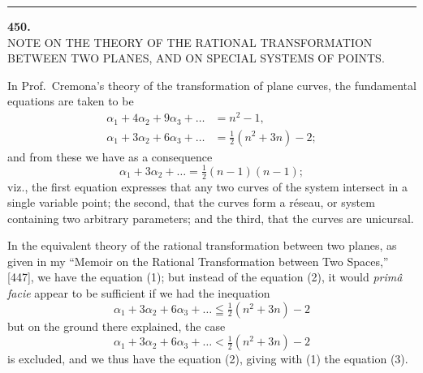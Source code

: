 \documentclass[11pt]{article}
\begin{document}
\bigskip
\hrule
\bigskip

\begin{center}
{\large\bfseries 450.}\\[6pt]
{\large NOTE ON THE THEORY OF THE RATIONAL TRANSFORMATION BETWEEN TWO PLANES, AND ON SPECIAL SYSTEMS OF POINTS.}
\end{center}

\medskip


\medskip

In Prof.\ Cremona's theory of the transformation of plane curves, the fundamental
equations are taken to be
\begin{align}
\alpha_1 + 4\alpha_2 + 9\alpha_3 + \ldots &= n^2 - 1 \tag{1},\\
\alpha_1 + 3\alpha_2 + 6\alpha_3 + \ldots &= \tfrac{1}{2}(n^2 + 3n) - 2 \tag{2};
\end{align}
and from these we have as a consequence
\begin{equation}
\alpha_1 + 3\alpha_2 + \ldots = \tfrac{1}{2}(n-1)(n-1) \tag{3};
\end{equation}
viz., the first equation expresses that any two curves of the system intersect in a
single variable point; the second, that the curves form a r\'eseau, or system containing
two arbitrary parameters; and the third, that the curves are unicursal.

In the equivalent theory of the rational transformation between two planes, as
given in my ``Memoir on the Rational Transformation between Two Spaces,'' [447], we
have the equation (1); but instead of the equation (2), it would \textit{prim\^a facie} appear
to be sufficient if we had the inequation
\[ \alpha_1 + 3\alpha_2 + 6\alpha_3 + \ldots \leqq \tfrac{1}{2}(n^2 + 3n) - 2 \]
but on the ground there explained, the case
\[ \alpha_1 + 3\alpha_2 + 6\alpha_3 + \ldots < \tfrac{1}{2}(n^2 + 3n) - 2 \]
is excluded, and we thus have the equation (2), giving with (1) the equation (3).
\end{document}
